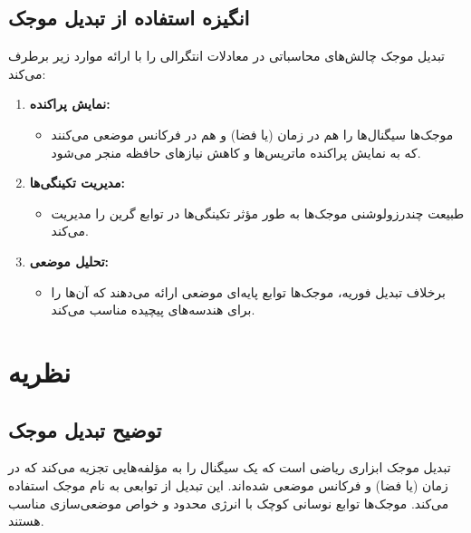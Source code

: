 \documentclass[12pt,a4paper]{article}
\begin{document}
\subsection{انگیزه استفاده از تبدیل موجک}
تبدیل موجک چالش‌های محاسباتی در معادلات انتگرالی را با ارائه موارد زیر برطرف می‌کند:
\begin{enumerate}
    \item \textbf{نمایش پراکنده:}
          \begin{itemize}
              \item موجک‌ها سیگنال‌ها را هم در زمان (یا فضا) و هم در فرکانس موضعی می‌کنند که به نمایش پراکنده ماتریس‌ها و کاهش نیازهای حافظه منجر می‌شود.
          \end{itemize}
    \item \textbf{مدیریت تکینگی‌ها:}
          \begin{itemize}
              \item طبیعت چندرزولوشنی موجک‌ها به طور مؤثر تکینگی‌ها در توابع گرین را مدیریت می‌کند.
          \end{itemize}
    \item \textbf{تحلیل موضعی:}
          \begin{itemize}
              \item برخلاف تبدیل فوریه، موجک‌ها توابع پایه‌ای موضعی ارائه می‌دهند که آن‌ها را برای هندسه‌های پیچیده مناسب می‌کند.
          \end{itemize}
\end{enumerate}

\newpage

\section{نظریه}

\subsection{توضیح تبدیل موجک}
تبدیل موجک ابزاری ریاضی است که یک سیگنال را به مؤلفه‌هایی تجزیه می‌کند که در زمان (یا فضا) و فرکانس موضعی شده‌اند. این تبدیل از توابعی به نام موجک استفاده می‌کند\cite{wavelet}. موجک‌ها توابع نوسانی کوچک با انرژی محدود و خواص موضعی‌سازی مناسب هستند.
\end{document}
